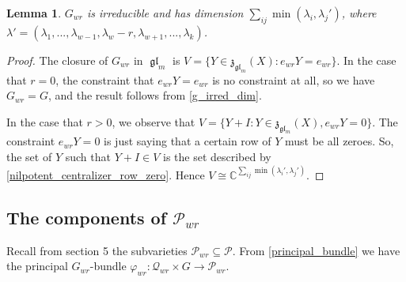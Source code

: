 \documentclass[12pt,psamsfonts]{article}
\DeclareMathOperator{\gl}{\mathfrak{gl}}
\newtheorem{lemma}[theorem]{Lemma}
\begin{document}
\begin{lemma}\label{gwr_irred_dim}
    \(G_{wr}\) is irreducible and has dimension \(\sum_{ij} \min(\lambda_i, \lambda_j')\), where \(\lambda' = (\lambda_1, ..., \lambda_{w - 1}, \lambda_w - r, \lambda_{w + 1}, ..., \lambda_k)\).
\end{lemma}
\begin{proof}
    The closure of \(G_{wr}\) in \(\gl_m\) is \(V = \{Y \in \mathfrak{z}_{\gl_m}(X) : e_{wr} Y = e_{wr}\}\).
    In the case that \(r = 0\), the constraint that \(e_{wr}Y = e_{wr}\) is no constraint at all, so we have \(G_{wr} = G\), and the result follows from \cref{g_irred_dim}.
    \par In the case that \(r > 0\), we observe that \(V = \{Y + I : Y \in \mathfrak{z}_{\gl_m}(X), e_{wr}Y = 0\}\).
    The constraint \(e_{wr}Y = 0\) is just saying that a certain row of \(Y\) must be all zeroes.
    So, the set of \(Y\) such that \(Y + I \in V\) is the set described by \cref{nilpotent_centralizer_row_zero}.
    Hence \(V \cong \mathbb{C}^{\sum_{ij}\min(\lambda_i', \lambda_j')}\).
\end{proof}

\subsection{The components of \texorpdfstring{\(\mathcal{P}_{wr}\)}{P\_\{wr\}}}
Recall from section 5 the subvarieties \(\mathcal{P}_{wr} \subseteq \mathcal{P}\).
From \cref{principal_bundle} we have the principal \(G_{wr}\)-bundle \(\varphi_{wr} : \mathcal{Q}_{wr} \times G \to \mathcal{P}_{wr}\).
\end{document}
